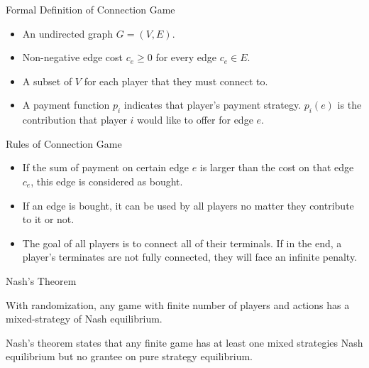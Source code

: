 \documentclass[11pt,aspectratio=169]{beamer}
\begin{document}
\begin{frame}{Formal Definition of Connection Game}
    \begin{definition}
          \begin{itemize}
            \item An undirected graph \(G = (V,E)\).
            \item Non-negative edge cost \(c_e \geq 0\) for every edge $c_e \in E$.
            \item A subset of \(V\) for each player that they must connect to. 
            \item A payment function \(p_i\) indicates that player's payment strategy. \(p_i(e)\) is the contribution that player \(i\) would like to offer for edge \(e\).
    \end{itemize}
    \end{definition}
\end{frame}

\begin{frame}{Rules of Connection Game}
\begin{definition}
    \begin{itemize}
    \item If the sum of payment on certain edge \(e\) is larger than the cost on that edge \(c_e\), this edge is considered as bought.
    \item If an edge is bought, it can be used by all players no matter they contribute to it or not. \\
    \item The goal of all players is to connect all of their terminals. If in the end, a player's terminates are not fully connected, they will face an infinite penalty.  
    \end{itemize}
    \end{definition}
\end{frame}

\begin{frame}{Nash's Theorem}
   
    \begin{theorem}
        With randomization, any game with finite number of players and actions has a mixed-strategy of Nash equilibrium.
    \end{theorem}
    Nash's theorem states that any finite game has at least one mixed strategies Nash equilibrium but no grantee on pure strategy equilibrium.  
\end{frame}
\end{document}

